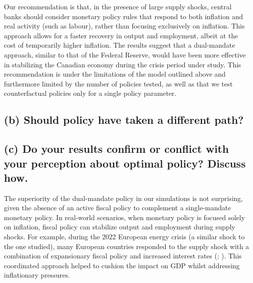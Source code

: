 \documentclass[12pt]{article}
\begin{document}
Our recommendation is that, in the presence of large supply shocks, central banks should consider monetary policy rules that respond to both inflation and real activity (such as labour), rather than focusing exclusively on inflation. This approach allows for a faster recovery in output and employment, albeit at the cost of temporarily higher inflation. The results suggest that a dual-mandate approach, similar to that of the Federal Reserve, would have been more effective in stabilizing the Canadian economy during the crisis period under study. This recommendation is under the limitations of the model outlined above and furthermore limited by the number of policies tested, as well as that we test counterfactual policies only for a single policy parameter. 

\subsection*{(b) Should policy have taken a different path?}

\subsection*{(c) Do your results confirm or conflict with your perception about optimal policy? Discuss how.}
The superiority of the dual-mandate policy in our simulations is not surprising, given the absence of an active fiscal policy to complement a single-mandate monetary policy. In real-world scenarios, when monetary policy is focused solely on inflation, fiscal policy can stabilize output and employment during supply shocks. For example, during the 2022 European energy crisis (a similar shock to the one studied), many European countries responded to the supply shock with a combination of expansionary fiscal policy and increased interest rates (\cite{bankoffinlandEuropeanCentralBanks2022}; \cite{checherita-westphalUpdateEuroArea2023}). This coordinated approach helped to cushion the impact on GDP whilst addressing inflationary pressures.
\newpage %
\printbibliography{} %

\newpage
\appendix
\end{document}
